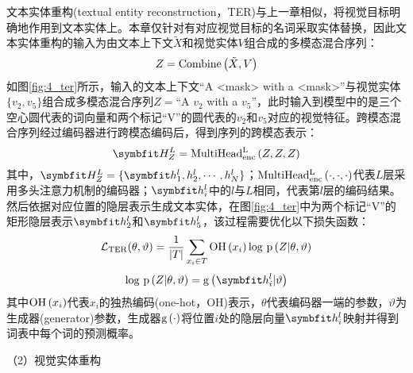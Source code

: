 
文本实体重构(textual entity reconstruction，TER)与上一章相似，将视觉目标明确地作用到文本实体上。本章仅针对有对应视觉目标的名词采取实体替换，因此文本实体重构的输入为由文本上下文$\tilde{X}$和视觉实体$V$组合成的多模态混合序列：
\begin{equation}
Z={\rm{Combine}} \left( \tilde{X}, V \right)
\end{equation}
如图\ref{fig:4_ter}所示，输入的文本上下文“A <mask> with a <mask>”与视觉实体$\{v_2,v_5\}$组合成多模态混合序列$Z=$“A $v_2$ with a $v_5$”，此时输入到模型中的是三个空心圆代表的词向量和两个标记“V”的圆代表的$v_2$和$v_5$对应的视觉特征。跨模态混合序列经过编码器进行跨模态编码后，得到序列的跨模态表示：
\begin{equation}
\Vector{H_Z^L}={\rm{MultiHead_{enc}^L}} \left( Z, Z, Z \right)
\end{equation}
其中，$\Vector{H_Z^L}=\{\Vector{h_1^l,h_2^l,\cdots,h_N^l}\}$；${\rm{MultiHead_{enc}^L}} \left( \cdot,\cdot,\cdot \right)$代表$L$层采用多头注意力机制的编码器；$\Vector{h_i^l}$中的$l$与$L$相同，代表第$l$层的编码结果。然后依据对应位置的隐层表示生成文本实体，在图\ref{fig:4_ter}中为两个标记“V”的矩形隐层表示${\Vector{h_2^l}}$和${\Vector{h_5^l}}$，该过程需要优化以下损失函数：
\begin{equation}
\mathcal{L}_{\rm{TER}} (\theta, \vartheta) =
    \frac{1}{{\vert}T{\vert}}
    \mathop{\sum}_{x_i \in T}
    {\rm{OH}} \left( x_i \right)
    {\rm log}{\ }{\rm p} \left( Z {\vert} \theta, \vartheta \right)
\end{equation}
\begin{equation}
{\log}{\ }{\rm p} \left( Z {\vert} \theta, \vartheta \right) =
    {\rm{g}} \left( \Vector{h_i^l} \vert \vartheta \right)
\end{equation}
其中${\rm{OH}}\left(x_i\right)$代表$x_i$的独热编码(one-hot，OH)表示，$\theta$代表编码器一端的参数，$\vartheta$为生成器(generator)参数，生成器${\rm{g}}\left(\cdot\right)$将位置$i$处的隐层向量${\Vector{h_i^l}}$映射并得到词表中每个词的预测概率。

{\sffamily （2）视觉实体重构}

